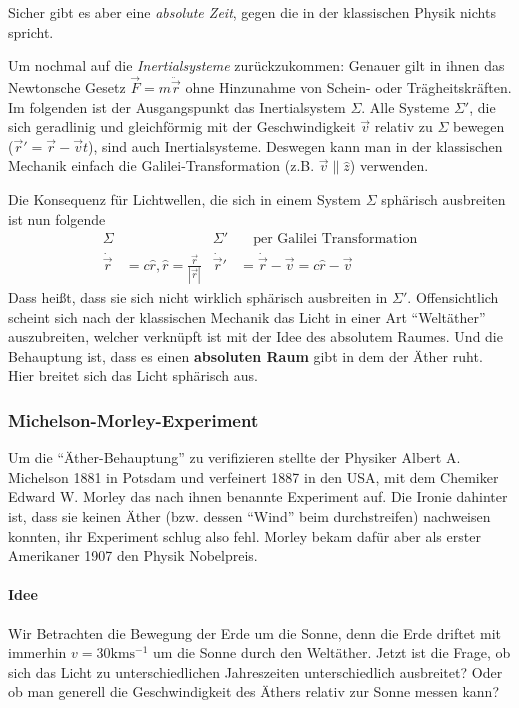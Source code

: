 \documentclass[oneside]{book}
\theoremstyle{definition}
\newcommand{\dotvec}[1]{\dot{\vec{#1}}}
\newcommand{\ddotvec}[1]{\ddot{\vec{#1}}}
\begin{document}
Sicher gibt es aber eine \textit{absolute Zeit}, gegen die in der klassischen Physik nichts spricht.

Um nochmal auf die \textit{Inertialsysteme} zurückzukommen: Genauer gilt in ihnen das Newtonsche Gesetz $\vec{F} = m \ddotvec{r}$ ohne Hinzunahme von Schein- oder Trägheitskräften. Im folgenden ist der Ausgangspunkt das Inertialsystem $\Sigma$.
Alle Systeme $\Sigma'$, die sich geradlinig und gleichförmig mit der Geschwindigkeit $\vec v$ relativ zu $\Sigma$ bewegen ($\vec{r}' = \vec{r} - \vec{v}t$), sind auch Inertialsysteme. Deswegen kann man in der klassischen Mechanik einfach die Galilei-Transformation (z.B. $\vec{v} \parallel \hat{z}$) verwenden.

Die Konsequenz für Lichtwellen, die sich in einem System $\Sigma$ sphärisch ausbreiten ist nun folgende
\begin{align*}
	\Sigma& & \Sigma'& \text{~~~per Galilei Transformation}\\
	\dotvec{r} &= c \hat{r}, \hat{r} = \frac{\vec{r}}{|\vec{r}|} & \dotvec{r}' &= \dotvec{r} - \vec{v} = c \hat{r} - \vec{v}   
\end{align*}
Dass heißt, dass sie sich nicht wirklich sphärisch ausbreiten in $\Sigma'$. Offensichtlich scheint sich nach der klassischen Mechanik das Licht in einer Art "`Weltäther"' auszubreiten, welcher verknüpft ist mit der Idee des absolutem Raumes. Und die Behauptung ist, dass es einen \textbf{absoluten Raum} gibt in dem der Äther ruht. Hier breitet sich das Licht sphärisch aus.

\subsubsection{Michelson-Morley-Experiment}
Um die "`Äther-Behauptung"' zu verifizieren stellte der Physiker Albert A. Michelson 1881 in Potsdam und verfeinert 1887 in den USA, mit dem Chemiker Edward W. Morley das nach ihnen benannte Experiment auf. Die Ironie dahinter ist, dass sie keinen Äther (bzw. dessen "`Wind"' beim durchstreifen) nachweisen konnten, ihr Experiment schlug also fehl. Morley bekam dafür aber als erster Amerikaner 1907 den Physik Nobelpreis.

\paragraph{Idee} Wir Betrachten die Bewegung der Erde um die Sonne, denn die Erde driftet mit immerhin $v = 30 \mathrm{km}\mathrm{s}^{-1}$ um die Sonne durch den Weltäther. Jetzt ist die Frage, ob sich das Licht zu unterschiedlichen Jahreszeiten unterschiedlich ausbreitet? Oder ob man generell die Geschwindigkeit des Äthers relativ zur Sonne messen kann?
\end{document}
